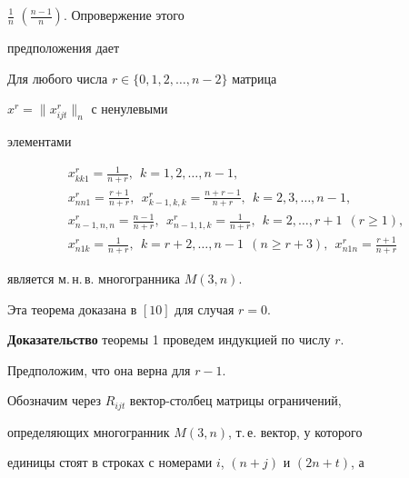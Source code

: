 $\frac{1}{n}$ $\left(\frac{n-1}{n}\right)$. Опровержение этого


предположения дает





\begin{thm}


Для любого числа $r\in \{0,1,2,\dotsc,n-2\}$ матрица


$x^r=\|x^r_{ijt}\|_n$ с ненулевыми


элементами


\begin{gather*}


x^r_{kk1}=\frac{1}{n+r},\ \ k=1,2,\dotsc,n-1,\\


%


x^r_{nn1}=\frac{r+1}{n+r},\ \ x^r_{k-1,k,k}=\frac{n+r-1}{n+r},


\ \ k=2,3,\dotsc,n-1,\\


%


x^r_{n-1,n,n}=\frac{n-1}{n+r},\ \ x^r_{n-1,1,k}=\frac{1}{n+r},


\ \ k=2,\dotsc,r+1\ \ (r\geq 1),\\


%


x^r_{n1k}=\frac{1}{n+r},\ \ k=r+2,\dotsc,n-1\ \ (n\geq r+3),


\ \ x^r_{n1n}=\frac{r+1}{n+r}


\end{gather*}


является м.\,н.\,в. многогранника $M(3,n)$.


\end{thm}





Эта теорема доказана в $[10]$ для случая $r=0$.





{\bf Доказательство} теоремы 1 проведем индукцией по числу $r$.


Предположим, что она верна для $r-1$.





Обозначим через $R_{ijt}$ вектор-столбец матрицы ограничений,


определяющих многогранник $M(3,n)$, т.\,е. вектор, у которого


единицы стоят в строках с номерами $i$, $(n+j)$ и $(2n+t)$, а


